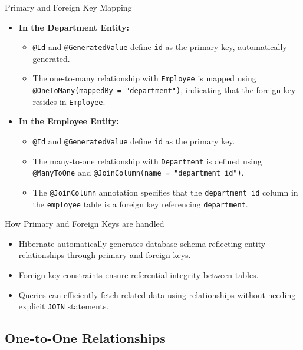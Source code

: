 \documentclass[aspectratio=169, table]{beamer}
\begin{document}
\begin{frame}{Primary and Foreign Key Mapping}
	\vspace{20pt}
	\begin{itemize}
		\item \textbf{In the Department Entity:}
		\begin{itemize}
			\item \texttt{@Id} and \texttt{@GeneratedValue} define \texttt{id} as the primary key, automatically generated.
			\item The one-to-many relationship with \texttt{Employee} is mapped using \texttt{@OneToMany(mappedBy = "department")}, indicating that the foreign key resides in \texttt{Employee}.
		\end{itemize}
		\item \textbf{In the Employee Entity:}
		\begin{itemize}
			\item \texttt{@Id} and \texttt{@GeneratedValue} define \texttt{id} as the primary key.
			\item The many-to-one relationship with \texttt{Department} is defined using \texttt{@ManyToOne} and \texttt{@JoinColumn(name = "department\_id")}.
			\item The \texttt{@JoinColumn} annotation specifies that the \texttt{department\_id} column in the \texttt{employee} table is a foreign key referencing \texttt{department}.
		\end{itemize}
	\end{itemize}
\end{frame}

\begin{frame}{How Primary and Foreign Keys are handled}
	\vspace{20pt}
	\begin{itemize}
		\item Hibernate automatically generates database schema reflecting entity relationships through primary and foreign keys.
		\item Foreign key constraints ensure referential integrity between tables.
		\item Queries can efficiently fetch related data using relationships without needing explicit \texttt{JOIN} statements.
	\end{itemize}
\end{frame}

\subsection{One-to-One Relationships}
\end{document}
